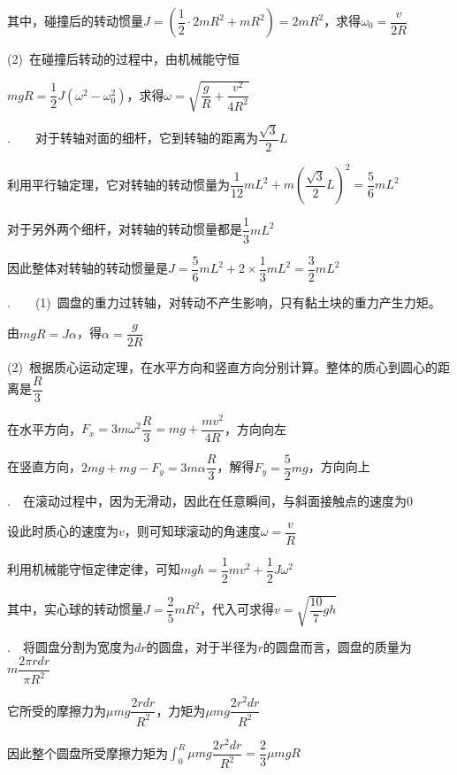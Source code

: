 其中，碰撞后的转动惯量$J=\left(\dfrac{1}{2}\cdot 2mR^2+mR^2\right)=2mR^2$，求得$\omega_0=\dfrac{v}{2R}$

(2)~在碰撞后转动的过程中，由机械能守恒

$mgR=\dfrac{1}{2}J(\omega^2-\omega_0^2)$，求得$\omega=\sqrt{\dfrac{g}{R}+\dfrac{v^2}{4R^2}}$

\noindent\hdashrule{\textwidth}{1pt}{1pt}

.~~~~对于转轴对面的细杆，它到转轴的距离为$\dfrac{\sqrt{3}}{2}L$

利用平行轴定理，它对转轴的转动惯量为$\dfrac{1}{12}mL^2+m\left(\dfrac{\sqrt{3}}{2}L\right)^2=\dfrac{5}{6}mL^2$

对于另外两个细杆，对转轴的转动惯量都是$\dfrac{1}{3}mL^2$

因此整体对转轴的转动惯量是$J=\dfrac{5}{6}mL^2+2\times \dfrac{1}{3}mL^2=\dfrac{3}{2}mL^2$


\newpage

.~~~~(1)~圆盘的重力过转轴，对转动不产生影响，只有黏土块的重力产生力矩。

由$mgR=J\alpha$，得$\alpha=\dfrac{g}{2R}$

(2)~根据质心运动定理，在水平方向和竖直方向分别计算。整体的质心到圆心的距离是$\dfrac{R}{3}$

在水平方向，$F_x=3m\omega^2\dfrac{R}{3}=mg+\dfrac{mv^2}{4R}$，方向向左

在竖直方向，$2mg+mg-F_y=3m\alpha \dfrac{R}{3}$，解得$F_y=\dfrac{5}{2}mg$，方向向上

\noindent\hdashrule{\textwidth}{1pt}{1pt}

.~~在滚动过程中，因为无滑动，因此在任意瞬间，与斜面接触点的速度为0

设此时质心的速度为$v$，则可知球滚动的角速度$\omega=\dfrac{v}{R}$

利用机械能守恒定律定律，可知$mgh=\dfrac{1}{2}mv^2+\dfrac{1}{2}J\omega^2$

其中，实心球的转动惯量$J=\dfrac{2}{5}mR^2$，代入可求得$v=\sqrt{\dfrac{10}{7}gh}$

\noindent\hdashrule{\textwidth}{1pt}{1pt}

.~~将圆盘分割为宽度为$dr$的圆盘，对于半径为$r$的圆盘而言，圆盘的质量为$m\dfrac{2\pi rdr}{\pi R^2}$

它所受的摩擦力为$\mu mg\dfrac{2rdr}{R^2}$，力矩为$\mu mg\dfrac{2r^2dr}{R^2}$

因此整个圆盘所受摩擦力矩为$\displaystyle\int_0^R{\mu mg\dfrac{2r^2dr}{R^2}}=\dfrac{2}{3}\mu mgR$

